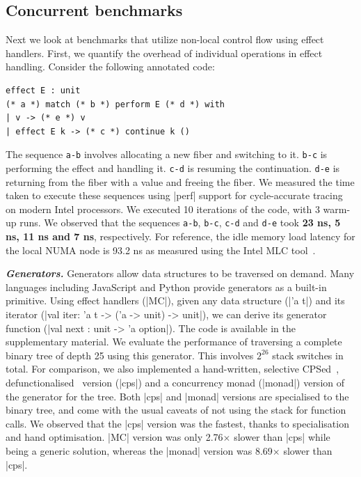 \documentclass[sigplan,10pt,review,anonymous]{acmart}\settopmatter{printfolios=true,printccs=false,printacmref=false}
\begin{document}
\vspace{-3mm}
\subsection{Concurrent benchmarks}

Next we look at benchmarks that utilize non-local control flow using effect
handlers. First, we quantify the overhead of individual operations in effect
handling. Consider the following annotated code:
\begin{lstlisting}
effect E : unit
(* a *) match (* b *) perform E (* d *) with
| v -> (* e *) v
| effect E k -> (* c *) continue k ()
\end{lstlisting}
The sequence \texttt{a-b} involves allocating a new fiber and switching to it.
\texttt{b-c} is performing the effect and handling it. \texttt{c-d} is resuming
the continuation. \texttt{d-e} is returning from the fiber with a value and
freeing the fiber. We measured the time taken to execute these sequences using
|perf| support for cycle-accurate tracing on modern Intel processors. We
executed 10 iterations of the code, with 3 warm-up runs. We observed that the
sequences \texttt{a-b}, \texttt{b-c}, \texttt{c-d} and \texttt{d-e} took
\textbf{23 ns, 5 ns, 11 ns and 7 ns}, respectively. For reference, the idle
memory load latency for the local NUMA node is 93.2 ns as measured using the
Intel MLC tool~\cite{mlc}.

\textbf{\textit{Generators.}} Generators allow data structures to be traversed on
demand. Many languages including JavaScript and Python provide generators as a
built-in primitive. Using effect handlers (|MC|), given any data structure
(|'a t|) and its iterator (|val iter: 'a t -> ('a -> unit) -> unit|), we can
derive its generator function (|val next : unit -> 'a option|). The code is
available in the supplementary material. We evaluate the performance of
traversing a complete binary tree of depth 25 using this generator. This
involves $2^{26}$ stack switches in total. For comparison, we also implemented
a hand-written, selective CPSed~\cite{Nielson01},
defunctionalised~\cite{Danvy01} version (|cps|) and a concurrency monad
(|monad|) version of the generator for the tree. Both |cps| and |monad|
versions are specialised to the binary tree, and come with the usual caveats of
not using the stack for function calls. We observed that the |cps| version was
the fastest, thanks to specialisation and hand optimisation. |MC| version was
only 2.76$\times$ slower than |cps| while being a generic
solution, whereas the |monad| version was 8.69$\times$ slower than |cps|.
\end{document}
